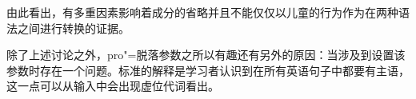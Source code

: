 由此看出，有多重因素影响着成分的省略并且不能仅仅以儿童的行为作为在两种语法之间进行转换的证据。

除了上述讨论之外，pro"=脱落参数之所以有趣还有另外的原因：当涉及到设置该参数时存在一个问题。标准的解释是学习者认识到在所有英语句子中都要有主语，这一点可以从输入中会出现虚位代词看出。

